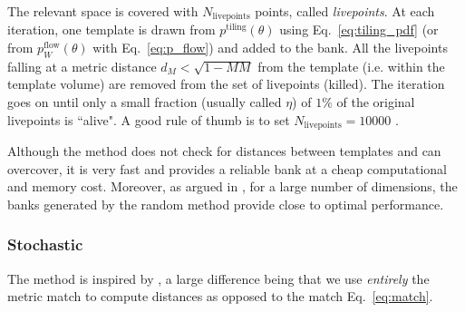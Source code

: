 \documentclass[twocolumn,showpacs,preprintnumbers,nofootinbib,prd,
superscriptaddress,10pt]{revtex4-2}
\begin{document}
The relevant space is covered with $N_\mathrm{livepoints}$ points, called {\it livepoints}.
At each iteration, one template is drawn from $p^{\text{tiling}}(\theta)$ using Eq.~\eqref{eq:tiling_pdf} (or from $p^{\text{flow}}_W(\theta)$ with Eq.~\eqref{eq:p_flow}) and added to the bank. All the livepoints falling at a metric distance $d_M<\sqrt{1-MM}$ from the template (i.e. within the template volume) are removed from the set of livepoints (killed). The iteration goes on until only a small fraction (usually called $\eta$) of $1\%$ of the original livepoints is ``alive". A good rule of thumb is to set $N_\mathrm{livepoints} = 10000$ \cite{Coogan:2022qxs}.

Although the method does not check for distances between templates and can overcover, it is very fast and provides a reliable bank at a cheap computational and memory cost.
Moreover, as argued in \cite{Messenger:2008ta, Allen:2021yuy, Allen:2022lqr}, for a large number of dimensions, the banks generated by the random method provide close to optimal performance.


\subsubsection{Stochastic}\label{par:stochastic}
The method is inspired by \cite{PhysRevD.80.104014}, a large difference being that we use {\it entirely} the metric match to compute distances as opposed to the match Eq.~\eqref{eq:match}.
\end{document}
